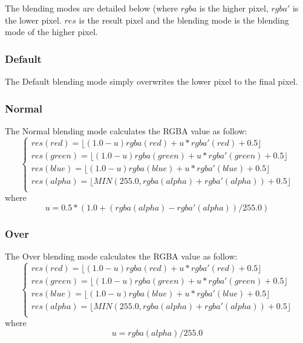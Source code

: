The blending modes are detailed below (where $rgba$ is the higher pixel, $rgba'$ is the lower pixel. $res$ is the result pixel and the blending mode is the blending mode of the higher pixel.\\

\subsubsection{Default}

The Default blending mode simply overwrites the lower pixel to the final pixel.

\subsubsection{Normal}

The Normal blending mode calculates the RGBA value as follow:\\
\begin{equation}
\left\lbrace\begin{array}{l}
res(red)=\lfloor(1.0-u)rgba(red)+u*rgba'(red)+0.5\rfloor\\
res(green)=\lfloor(1.0-u)rgba(green)+u*rgba'(green)+0.5\rfloor\\
res(blue)=\lfloor(1.0-u)rgba(blue)+u*rgba'(blue)+0.5\rfloor\\
res(alpha)=\lfloor MIN(255.0,rgba(alpha)+rgba'(alpha))+0.5\rfloor\\
\end{array}\right.
\end{equation}
where 
\begin{equation}
u = 0.5*(1.0+(rgba(alpha)-rgba'(alpha))/255.0)
\end{equation}

\subsubsection{Over}

The Over blending mode calculates the RGBA value as follow:\\
\begin{equation}
\left\lbrace\begin{array}{l}
res(red)=\lfloor(1.0-u)rgba(red)+u*rgba'(red)+0.5\rfloor\\
res(green)=\lfloor(1.0-u)rgba(green)+u*rgba'(green)+0.5\rfloor\\
res(blue)=\lfloor(1.0-u)rgba(blue)+u*rgba'(blue)+0.5\rfloor\\
res(alpha)=\lfloor MIN(255.0,rgba(alpha)+rgba'(alpha))+0.5\rfloor\\
\end{array}\right.
\end{equation}
where 
\begin{equation}
u = rgba(alpha)/255.0
\end{equation}

